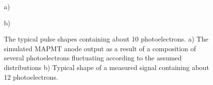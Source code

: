 \documentclass{webofc}
\begin{document}
\begin{figure}[h]
	\begin{minipage}[h]{0.45\linewidth}
		 a) \\
	\end{minipage}
	\hfill
	\begin{minipage}[h]{0.45\linewidth}
		 b) \\
	\end{minipage}
	\caption{ The typical pulse shapes containing about 10 photoelectrons. a) The simulated MAPMT anode output as a result of a composition of several photoelectrons fluctuating according to the assumed distributions  b) Typical shape of a measured signal containing about 12 photoelectrons.}
	\label{ris:sim}
\end{figure}
\end{document}
